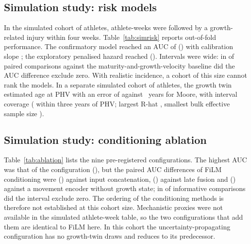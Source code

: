 \documentclass[journal]{IEEEtran}
\begin{document}
\subsection{Simulation study: risk models}
In the simulated cohort of \SimAthletes{} athletes, \SimEventWeeks{} athlete-weeks were followed
by a growth-related injury within four weeks. Table~\ref{tab:simrisk} reports out-of-fold
performance. The confirmatory model reached an AUC of \SimConfAuc{} (\SimConfAucCI{}) with
calibration slope \SimConfSlope{}; the exploratory penalised hazard reached \SimLogitAuc{}
(\SimLogitAucCI{}). Intervals were wide: in \SimDiffExcludingZero{} of \SimDiffCount{} paired
comparisons against the maturity-and-growth-velocity baseline did the AUC difference exclude
zero. With realistic incidence, a cohort of this size cannot rank the models. In a separate simulated cohort of \SimGrowthN{} athletes, the growth twin
estimated age at PHV with an error of \SimTwinMAE{} against \SimMooreMAE{}~years for Moore,
with \SimCoverage{} interval coverage (\SimCoverageNear{} within three years of PHV; largest
R-hat \SimRhat{}, smallest bulk effective sample size \SimESS{}).

\begin{table}[!t]
\caption{Simulated risk models (SYNTHETIC), growth-related injury within four weeks.}
\label{tab:simrisk}
\centering
\resizebox{\columnwidth}{!}{}
\end{table}

\subsection{Simulation study: conditioning ablation}
Table~\ref{tab:ablation} lists the nine pre-registered configurations. The highest AUC was
that of the \AblBestName{} configuration (\AblBestAuc{}), but the paired AUC differences of
FiLM conditioning were \AblFilmVsConcat{} (\AblFilmVsConcatCI{}) against input concatenation,
\AblFilmVsLate{} (\AblFilmVsLateCI{}) against late fusion and \AblFilmVsNone{}
(\AblFilmVsNoneCI{}) against a movement encoder without growth state; in
\AblDiffExcludingZero{} of \AblDiffCount{} informative comparisons did the interval exclude zero.
The ordering of the conditioning methods is therefore not established at this cohort size.
Mechanistic proxies were not available in the simulated athlete-week table, so the two
configurations that add them are identical to FiLM here. In this cohort the uncertainty-propagating configuration has no growth-twin draws and
reduces to its predecessor.
\end{document}
